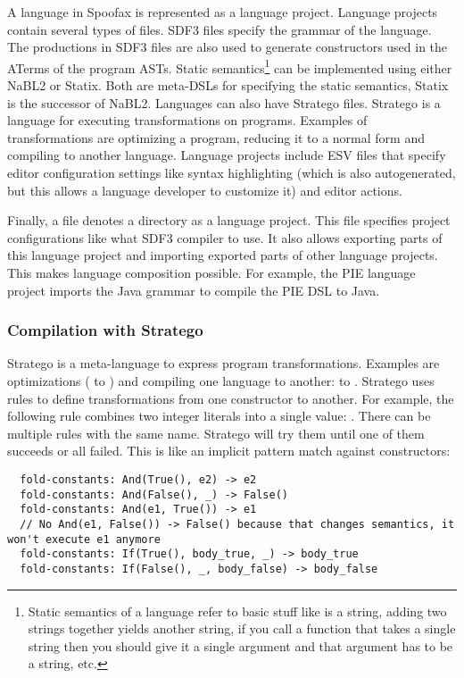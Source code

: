 A language in Spoofax is represented as a language project.
Language projects contain several types of files.
\Ac{SDF3} files specify the grammar of the language.
The productions in \ac{SDF3} files are also used to generate constructors used in the ATerms of the program \acp{AST}.
Static semantics\footnote{Static semantics of a language refer to basic stuff like  is a string, adding two strings together yields another string, if you call a function that takes a single string then you should give it a single argument and that argument has to be a string, etc.}
can be implemented using either \ac{NaBL2} or Statix.
Both are meta-\acp{DSL} for specifying the static semantics, Statix is the successor of \ac{NaBL2}.
Languages can also have Stratego files.
Stratego is a language for executing transformations on programs.
Examples of transformations are optimizing a program, reducing it to a normal form and compiling to another language.
Language projects include \ac{ESV} files that specify editor configuration settings like syntax highlighting (which is also autogenerated, but this allows a language developer to customize it) and editor actions.

Finally, a  file denotes a directory as a language project.
This file specifies project configurations like what \ac{SDF3} compiler to use.
It also allows exporting parts of this language project and importing exported parts of other language projects.
This makes language composition possible.
For example, the \ac{PIE} language project imports the Java grammar to compile the \ac{PIE} \ac{DSL} to Java.

\subsubsection{Compilation with Stratego}
\label{subsubsec:problem_analysis__background__stratego}

Stratego is a meta-language to express program transformations.
Examples are optimizations ( to ) and compiling one language to another:  to .
Stratego uses rules to define transformations from one constructor to another.
For example, the following rule combines two integer literals into a single value: .
There can be multiple rules with the same name.
Stratego will try them until one of them succeeds or all failed.
This is like an implicit pattern match against constructors:
\begin{lstlisting}
  fold-constants: And(True(), e2) -> e2
  fold-constants: And(False(), _) -> False()
  fold-constants: And(e1, True()) -> e1
  // No And(e1, False()) -> False() because that changes semantics, it won't execute e1 anymore
  fold-constants: If(True(), body_true, _) -> body_true
  fold-constants: If(False(), _, body_false) -> body_false
\end{lstlisting}

